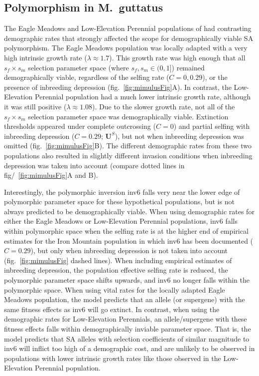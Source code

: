 \documentclass[11pt]{article}
\def\mbf#1{\mathbf{#1}}
\begin{document}
\subsection*{Polymorphism in M.~guttatus} \label{sec:Mgutt}

The Eagle Meadows and Low-Elevation Perennial populations of \citet{PetersonEtAl2016} had contrasting demographic rates that strongly affected the scope for demographically viable SA polymorphism. The Eagle Meadows population was locally adapted with a very high intrinsic growth rate ($\lambda \approx 1.7$). This growth rate was high enough that all $s_f \times s_m$ selection parameter space (where $s_f, s_m \in (0,1]$) remained demographically viable, regardless of the selfing rate ($C = 0,0.29$), or the presence of inbreeding depression (fig.~\ref{fig:mimulusFig}A). In contrast, the Low-Elevation Perennial population had a much lower intrinsic growth rate, although it was still positive ($\lambda \approx 1.08$). Due to the slower growth rate, not all of the $s_f \times s_m$ selection parameter space was demographically viable. Extinction thresholds appeared under complete outcrossing ($C = 0$) and partial selfing with inbreeding depression ($C = 0.29$; $\mbf{U}^{S}$), but not when inbreeding depression was omitted (fig.~\ref{fig:mimulusFig}B). The different demographic rates from these two populations also resulted in slightly different invasion conditions when inbreeding depression was taken into account (compare dotted lines in fig/~\ref{fig:mimulusFig}A and B).

Interestingly, the polymorphic inversion inv6 falls very near the lower edge of polymorphic parameter space for these hypothetical populations, but is not always predicted to be demographically viable. When using demographic rates for either the Eagle Meadows or Low-Elevation Perennial populations, inv6 falls within polymorphic space when the selfing rate is at the higher end of empirical estimates for the Iron Mountain population in which inv6 has been documented ($C = 0.29$), but only when inbreeding depression is not taken into account (fig.~\ref{fig:mimulusFig} dashed lines). When including empirical estimates of inbreeding depression, the population effective selfing rate is reduced, the polymorphic parameter space shifts upwards, and inv6 no longer falls within the polymorphic space. When using vital rates for the locally adapted Eagle Meadows population, the model predicts that an allele (or supergene) with the same fitness effects as inv6 will go extinct. In contrast, when using the demographic rates for Low-Elevation Perennials, an allele/supergene with these fitness effects falls within demographically inviable parameter space. That is, the model predicts that SA alleles with selection coefficients of similar magnitude to inv6 will inflict too high of a demographic cost, and are unlikely to be observed in populations with lower intrinsic growth rates like those observed in the Low-Elevation Perennial population.
\end{document}
